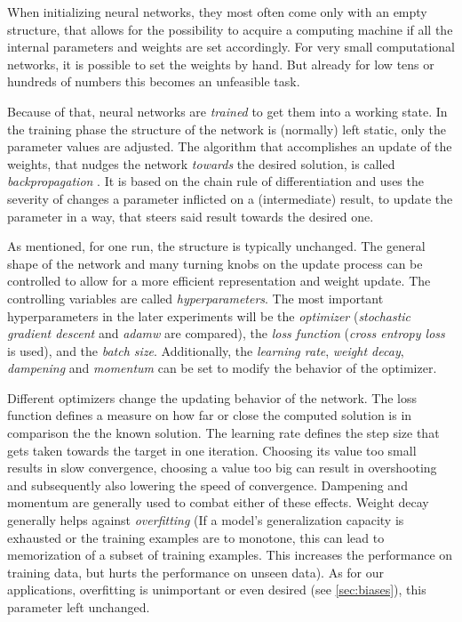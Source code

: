When initializing neural networks, they most often come only with an empty structure, that allows for the possibility to acquire a computing machine if all the internal parameters and weights are set accordingly.
For very small computational networks, it is possible to set the weights by hand.
But already for low tens or hundreds of numbers this becomes an unfeasible task. 

Because of that, neural networks are \emph{trained} to get them into a working state. In the training phase the structure of the network is (normally) left static, only the parameter values are adjusted. 
The algorithm that accomplishes an update of the weights, that nudges the network \emph{towards} the desired solution, is called \emph{backpropagation} \cite{machineLearningMitchell}.
It is based on the chain rule of differentiation and uses the severity of changes a parameter inflicted on a (intermediate) result, to update the parameter in a way, that steers said result towards the desired one. 

As mentioned, for one run, the structure is typically unchanged. 
The general shape of the network and many turning knobs on the update process can be controlled to allow for a more efficient representation and weight update.
The controlling variables are called \emph{hyperparameters}.
The most important hyperparameters in the later experiments will be the \emph{optimizer} (\emph{stochastic gradient descent} and \emph{adamw} \cite{adamwOptimizer} are compared), the \emph{loss function} (\emph{cross entropy loss} is used), and the \emph{batch size}. 
Additionally, the \emph{learning rate}, \emph{weight decay}, \emph{dampening} and \emph{momentum} can be set to modify the behavior of the optimizer.

Different optimizers change the updating behavior of the network. 
The loss function defines a measure on how far or close the computed solution is in comparison the the known solution.
The learning rate defines the step size that gets taken towards the target in one iteration.
Choosing its value too small results in slow convergence, choosing a value too big can result in overshooting and subsequently also lowering the speed of convergence.
Dampening and momentum are generally used to combat either of these effects.
Weight decay generally helps against \emph{overfitting} (If a model's generalization capacity is exhausted or the training examples are to monotone, this can lead to memorization of a subset of training examples. This increases the performance on training data, but hurts the performance on unseen data). 
As for our applications, overfitting is unimportant or even desired (see \autoref{sec:biases}), this parameter left unchanged.

